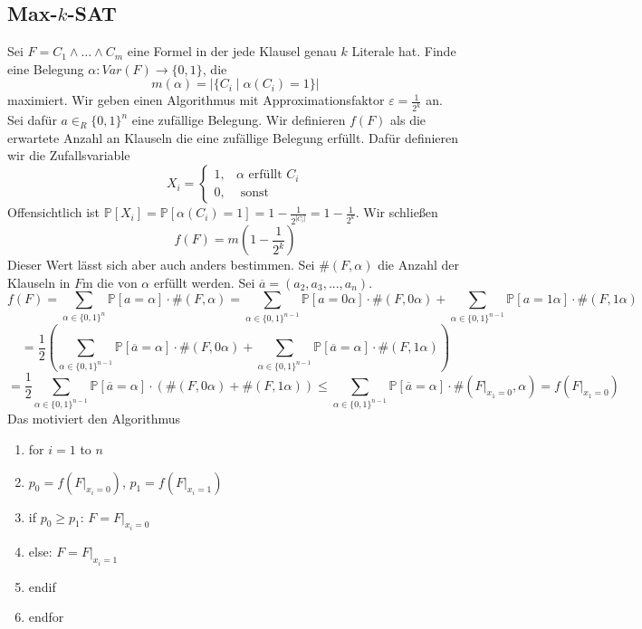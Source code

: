 \documentclass[a4paper, 12pt]{article}
\theoremstyle{plain}
\theoremstyle{definition}
\theoremstyle{lemma}
\theoremstyle{remark}
\theoremstyle{corollary}
\theoremstyle{example}
\begin{document}
	\subsection{Max-$k$-SAT}
	Sei $F = C_1 \land \dots \land C_m$ eine Formel in der jede Klausel genau $k$ Literale hat. Finde eine Belegung $\alpha: Var(F) \to \{0,1\}$, die \[m(\alpha) = \left|\{C_i \mid \alpha(C_i) = 1\}\right|\] maximiert. Wir geben einen Algorithmus mit Approximationsfaktor $\varepsilon = \frac{1}{2^k}$ an.\\
	Sei dafür $a \in_R \{0,1\}^n$ eine zufällige Belegung. Wir definieren $f(F)$ als die erwartete Anzahl an Klauseln die eine zufällige Belegung erfüllt. Dafür definieren wir die Zufallsvariable $$X_i = \begin{cases}
		1, & \alpha \text{ erfüllt } C_i\\
		0, & \text{ sonst}
	\end{cases}$$ Offensichtlich ist $\mathbb{P}[X_i] = \mathbb{P}[\alpha(C_i) = 1] = 1 - \frac{1}{2^{\left|C_i\right|}} = 1-\frac{1}{2^k}$. Wir schließen \[f(F) = m\left(1-\frac{1}{2^k}\right)\]
	Dieser Wert lässt sich aber auch anders bestimmen. Sei $\#(F,\alpha)$ die Anzahl der Klauseln in $F$m die von $\alpha$ erfüllt werden. Sei $\overline{a} = (a_2,a_3,...,a_n)$. \[f(F) = \sum_{\alpha \in \{0,1\}^n} \mathbb{P}[a = \alpha] \cdot \#(F,\alpha) = \sum_{\alpha \in \{0,1\}^{n-1}} \mathbb{P}[a = 0\alpha] \cdot \#(F,0\alpha) + \sum_{\alpha \in \{0,1\}^{n-1}} \mathbb{P}[a = 1\alpha] \cdot \#(F,1\alpha)\]
	\[= \frac{1}{2}\left(\sum_{\alpha \in \{0,1\}^{n-1}} \mathbb{P}[\overline{a} = \alpha] \cdot \#(F,0\alpha) + \sum_{\alpha \in \{0,1\}^{n-1}} \mathbb{P}[\overline{a} = \alpha] \cdot \#(F,1\alpha)\right)\]
	\[= \frac{1}{2} \sum_{\alpha \in \{0,1\}^{n-1}} \mathbb{P}[\overline{a} = \alpha] \cdot \left(\#(F,0\alpha) + \#(F,1\alpha)\right) \leq \sum_{\alpha \in \{0,1\}^{n-1}} \mathbb{P}[\overline{a} = \alpha] \cdot \#(F|_{x_1=0},\alpha) = f(F|_{x_1=0})\]
	Das motiviert den Algorithmus
	\begin{enumerate}
		\item for $i=1$ to $n$
		\item $p_0 = f(F|_{x_i=0})$, $p_1 = f(F|_{x_i=1})$
		\item if $p_0 \geq p_1$: $F=F|_{x_i=0}$
		\item else: $F=F|_{x_i=1}$
		\item endif
		\item endfor
	\end{enumerate}
\end{document}
